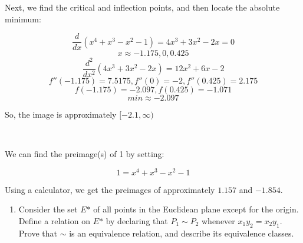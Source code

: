 \documentclass{article}
\begin{document}
Next, we find the critical and inflection points, and then locate the absolute minimum:

\[\frac{d}{dx}(x^4 + x^3 - x^2 - 1) = 4x^3 + 3x^2 - 2x = 0\]
\[x \approx -1.175, 0, 0.425\]
\[\frac{d^2}{dx^2}(4x^3 + 3x^2 - 2x) = 12x^2 + 6x - 2\]
\[f''(-1.175) = 7.5175, f''(0) = -2, f''(0.425) = 2.175\]
\[f(-1.175) = -2.097, f(0.425) = -1.071\]
\[min \approx -2.097\]

So, the image is approximately $[-2.1, \infty)$

\,

We can find the preimage(s) of 1 by setting:

\[1 = x^4 + x^3 - x^2 - 1\]

Using a calculator, we get the preimages of approximately $1.157$ and $-1.854$.

\begin{enumerate}[resume]
    \item Consider the set $E\mbox{*}$ of all points in the Euclidean plane except for the origin. Define a relation on $E\mbox{*}$ by declaring that $P_1 \sim P_2$ whenever $x_1y_2 = x_2y_1$. Prove that $\sim$ is an equivalence relation, and describe its equivalence classes.
\end{enumerate}
\end{document}
